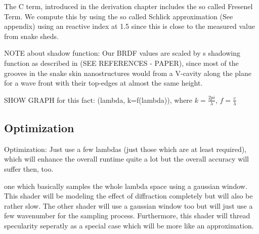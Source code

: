 The C term, introduced in the derivation chapter includes the so called Fresenel Term. We compute this by using the so called Schlick approximation (See appendix) using an reactive index at 1.5 since this is close to the measured value from snake sheds.

NOTE about shadow function:  Our BRDF values are scaled by s shadowing function as described in (SEE REFERENCES - PAPER), since most of the grooves in the snake skin nanostructures would from a V-cavity along the plane for a wave front with their top-edges at almost the same height.   

SHOW GRAPH for this fact: (lambda, k=f(lambda)), where $k = \frac{2pi}{\lambda}$, $f = \frac{c}{\lambda}$

\subsection{Optimization}
Optimization: Just use a few lambdas (just those which are at least required), which will enhance the overall runtime quite a lot but the overall accuracy will suffer then, too.


one which basically samples the whole lambda space using a gaussian window. This shader will be modeling the effect of diffraction completely but will also be rather slow. The other shader will use a gaussian window too but will just use a few wavenumber for the sampling process. Furthermore, this shader will thread specularity seperatly as a special case which will be more like an approximation. 